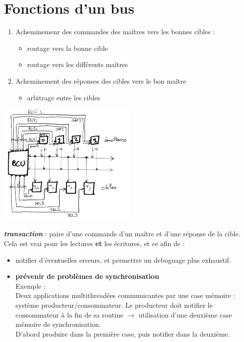 \section{Fonctions d'un bus}
\begin{enumerate}
  \item Acheminemenr des commandes des maîtres vers les bonnes cibles :
  \begin{itemize}
    \item routage vers la bonne cible
    \item routage vers les différents maîtres
  \end{itemize}
  \item Acheminement des réponses des cibles vers le bon maître
  \begin{itemize}
    \item arbitrage entre les cibles
  \end{itemize}
\end{enumerate}\begin{center}
  \includegraphics[height=6cm]{cours2/pics/bcu.jpg}
\end{center}
{\it\bf transaction} : paire d'une commande d'un maître et d'une réponse de la cible.\\
Cela est vrai pour les lectures {\bf et} les écritures, et ce afin de :
\begin{itemize}
  \item notifier d'éventuelles erreurs, et permettre un deboguage plus exhaustif.
  \item {\bf prévenir de problèmes de synchronisation}\\
  Exemple : \\
  Deux applications multithreadées communicantes par une case mémoire : système
  producteur/consommateur. Le producteur doit notifier le consommateur à la fin
  de sa routine $\rightarrow$ utilisation d'une deuxième case mémoire de synchronisation.\\
  D'abord produire dans la première case, puis notifier dans la deuxième.
\end{itemize}

